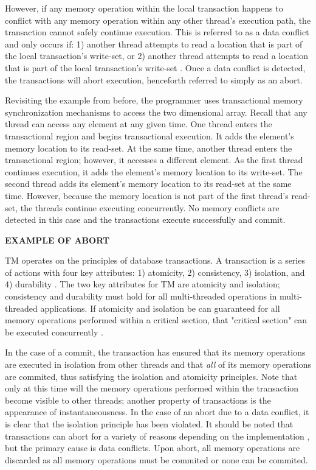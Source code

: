 \documentclass[a4paper]{article}
\begin{document}
\indent 
However, if any memory operation within the local transaction happens to  
conflict with any memory operation within any other thread's execution path, the
transaction cannot safely continue execution.  This is referred to as a data
conflict and only occurs if: 1) another thread attempts to read a location that
is part of the local transaction's write-set, or 2) another thread attempts to
read a location that is part of the local transaction's write-set
\cite{intel_prog_ref}.  Once a data conflict is detected, the transactions will
abort execution, henceforth referred to simply as an abort.
\par

\indent
Revisiting the example from before, the programmer uses transactional memory
synchronization mechanisms to access the two dimensional array.  Recall that any
thread can access any element at any given time.  One thread enters the
transactional region and begins transactional execution.  It adds the element's 
memory location to its read-set.  At the same time, another thread enters the
transactional region; however, it accesses a different element.  As the first
thread continues execution, it adds the element's memory location to its write-set.
The second thread adds its element's memory location to its read-set at the same
time.  However, because the memory location is not part of the first thread's
read-set, the threads continue executing concurrently.  No memory conflicts are
detected in this case and the transactions execute successfully and commit.
\par

\indent
\textbf{EXAMPLE OF ABORT}
\par

\indent 
TM operates on the principles of database transactions.  A transaction
is a series of actions with four key attributes: 1) atomicity, 2) consistency,
3) isolation, and 4) durability \cite{tm_2nd}.  The two key attributes for TM
are atomicity and isolation; consistency and durability must hold for all
multi-threaded operations in multi-threaded applications.  If atomicity and
isolation be can guaranteed for all memory operations performed within a
critical section, that "critical section" can be executed concurrently
\cite{sle_rajwar}.
\par 

\indent 
In the case of a commit, the transaction has ensured that its memory
operations are executed in isolation from other threads and that \textit{all} of its
memory operations are commited, thus satisfying the isolation and
atomicity principles.  Note that only at this time will the memory operations
performed within the transaction become visible to other threads; another
property of transactions is the appearance of instantaneousness.  In the case
of an abort due to a data conflict, it is clear that the isolation principle has
been violated.  It should be noted that transactions can abort for a variety of
reasons depending on the implementation \cite{intel_opt_man,chung_amd}, but the
primary cause is data conflicts.  Upon abort, all memory operations are
discarded as all memory operations must be commited or none can be commited.
\par
\end{document}
